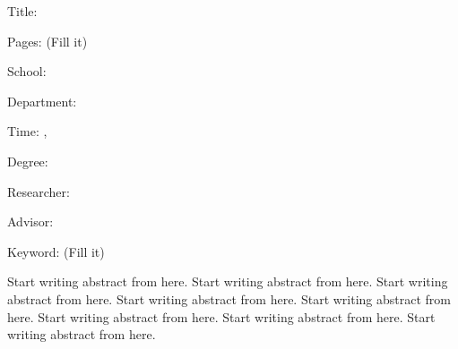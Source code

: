\begin{EnAbstract}
    \begin{EnAbstractItems}
        \noindent \text Title: \eTitle

        \noindent \text Pages: (Fill it)

        \noindent \text School: \univEname

        \noindent \text Department: \deptEname

        \noindent \text Time: \eMonth, \eYear

        \noindent \text Degree: \degreeEname

        \noindent \text Researcher: \myEname

        \noindent \text Advisor: \advisorEname
        
        \noindent \text Keyword: (Fill it)

    \end{EnAbstractItems}

    \begin{EnAbstractDescription}
        Start writing abstract from here. Start writing abstract from here. Start writing abstract from here. Start writing abstract from here. Start writing abstract from here. Start writing abstract from here. Start writing abstract from here. Start writing abstract from here.
    \end{EnAbstractDescription}
    
\end{EnAbstract}

